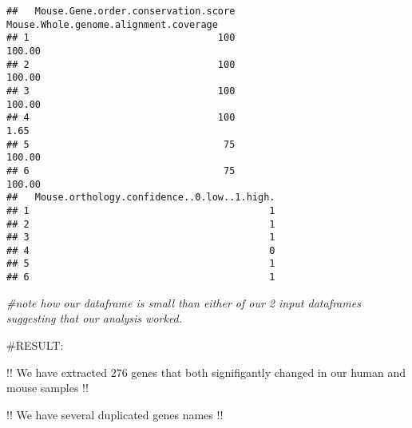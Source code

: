 \documentclass[
]{article}
\newenvironment{Shaded}{\begin{snugshade}}{\end{snugshade}}
\newcommand{\AttributeTok}[1]{\textcolor[rgb]{0.13,0.29,0.53}{#1}}
\newcommand{\CommentTok}[1]{\textcolor[rgb]{0.56,0.35,0.01}{\textit{#1}}}
\newcommand{\ConstantTok}[1]{\textcolor[rgb]{0.56,0.35,0.01}{#1}}
\newcommand{\FunctionTok}[1]{\textcolor[rgb]{0.13,0.29,0.53}{\textbf{#1}}}
\newcommand{\NormalTok}[1]{#1}
\newcommand{\OtherTok}[1]{\textcolor[rgb]{0.56,0.35,0.01}{#1}}
\newcommand{\SpecialCharTok}[1]{\textcolor[rgb]{0.81,0.36,0.00}{\textbf{#1}}}
\newcommand{\StringTok}[1]{\textcolor[rgb]{0.31,0.60,0.02}{#1}}
\begin{document}
\begin{verbatim}
##   Mouse.Gene.order.conservation.score Mouse.Whole.genome.alignment.coverage
## 1                                 100                                100.00
## 2                                 100                                100.00
## 3                                 100                                100.00
## 4                                 100                                  1.65
## 5                                  75                                100.00
## 6                                  75                                100.00
##   Mouse.orthology.confidence..0.low..1.high.
## 1                                          1
## 2                                          1
## 3                                          1
## 4                                          0
## 5                                          1
## 6                                          1
\end{verbatim}

\begin{Shaded}
\begin{Highlighting}[]
\CommentTok{\#note how our dataframe is small than either of our 2 input dataframes suggesting that our analysis worked. }
\end{Highlighting}
\end{Shaded}

\#RESULT:

!! We have extracted 276 genes that both signifigantly changed in our
human and mouse samples !!

!! We have several duplicated genes names !!

\begin{Shaded}
\end{Shaded}
\end{document}
